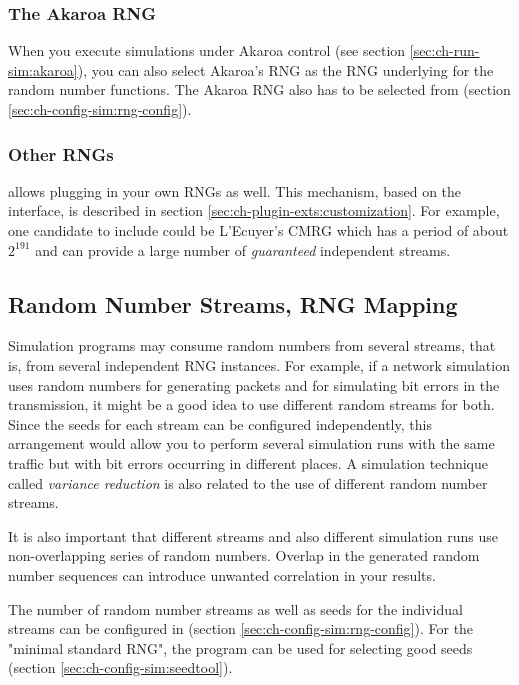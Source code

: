 \subsubsection{The Akaroa RNG}

When you execute simulations under Akaroa control (see section
\ref{sec:ch-run-sim:akaroa}), you can also select Akaroa's
RNG as the RNG underlying for the {\opp} random number functions.
The Akaroa RNG also has to be selected from 
(section \ref{sec:ch-config-sim:rng-config}).

\subsubsection{Other RNGs}

{\opp} allows plugging in your own RNGs as well. This mechanism,
based on the  interface, is described in section
\ref{sec:ch-plugin-exts:customization}.
For example, one candidate to include could be L'Ecuyer's CMRG \cite{LEcuyer02}
which has a period of about $2^{191}$ and can provide a large
number of \textit{guaranteed} independent streams.


\subsection{Random Number Streams, RNG Mapping}

Simulation programs may consume random numbers from several streams,
that is, from several independent RNG instances. For example, if a
network simulation uses random numbers for generating packets and
for simulating bit errors in the transmission, it might be a good
idea to use different random streams for both. Since the seeds
for each stream can be configured independently, this arrangement
would allow you to perform several simulation runs with the same traffic
but with bit errors occurring in different places.
A simulation technique called \textit{variance reduction} is
also related to the use of different random number streams.

It is also important that different streams and also different
simulation runs use non-overlapping series of random numbers.
Overlap in the generated random number sequences can introduce
unwanted correlation in your results.

The number of random number streams as well as seeds for the individual
streams can be configured in 
(section \ref{sec:ch-config-sim:rng-config}).
For the "minimal standard RNG", the  program can be
used for selecting good seeds (section \ref{sec:ch-config-sim:seedtool}).


